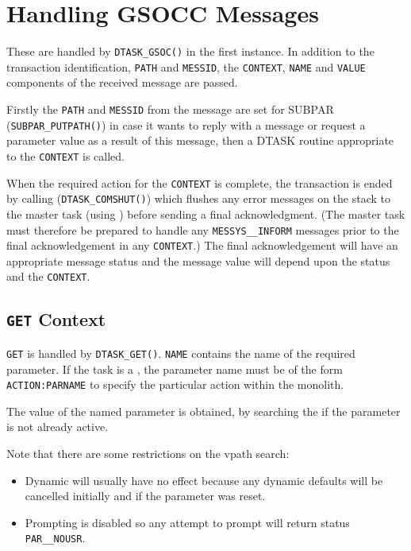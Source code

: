 \documentclass[twoside,11pt,nolof]{starlink}
\begin{document}
\section{\label{handling_gsocc_messages}Handling GSOCC Messages}
These are handled by \texttt{DTASK\_GSOC()} in the first instance. In addition
to the transaction identification, \texttt{PATH} and \texttt{MESSID}, the
\texttt{CONTEXT}, \texttt{NAME} and \texttt{VALUE} components of the received
message are passed.

Firstly the \texttt{PATH} and \texttt{MESSID} from the message are set for
SUBPAR (\texttt{SUBPAR\_PUTPATH()}) in case it wants to reply with a message or
request a parameter value as a result of this message, then a DTASK routine
appropriate to the \texttt{CONTEXT} is called.

When the required action for the \texttt{CONTEXT} is complete, the transaction
is ended by calling (\texttt{DTASK\_COMSHUT()}) which flushes any error
messages on the stack to the master task (using
)
before sending a final acknowledgment.
(The master task must therefore be prepared to handle any
\texttt{MESSYS\_\_INFORM} messages prior to the final acknowledgement in any
\texttt{CONTEXT}.)
The final acknowledgement will have an appropriate message status and the
message value will depend upon the status and the \texttt{CONTEXT}.

\subsection{\label{get_context}\texttt{GET} Context}
\texttt{GET} is handled by \texttt{DTASK\_GET()}.
\texttt{NAME} contains the name of the required parameter. If the task is a
, the parameter name must be of the form
\texttt{ACTION:PARNAME} to specify the particular action within the monolith.

The value of the named parameter is obtained, by searching the
if the parameter is not already active.

Note that there are some restrictions on the vpath search:
\begin{itemize}
\item Dynamic will usually have no effect because any
dynamic defaults will be cancelled initially and if the parameter was reset.
\item Prompting is disabled so any attempt to prompt will return status
\texttt{PAR\_\_NOUSR}.
\end{itemize}
\end{document}
